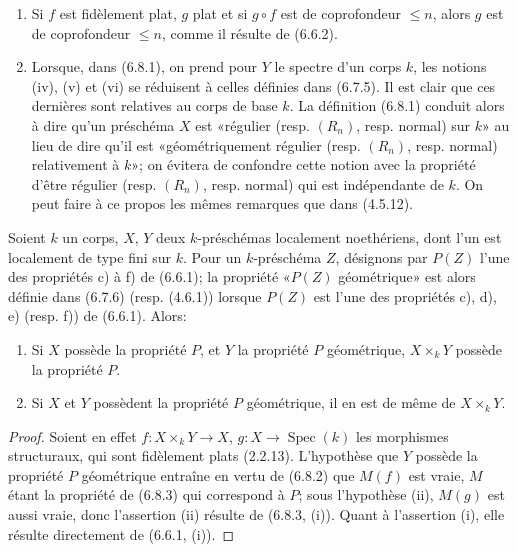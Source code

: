 \begin{remarks}[6.8.4]
\label{IV.2.s6.8.4-fr}
\begin{enumerate}
\item[(i)] Si $f$ est fidèlement plat, $g$ plat et si $g\circ f$ est de
coprofondeur $\leq n$, alors $g$ est de coprofondeur $\leq n$, comme il
résulte de (6.6.2).
\item[(ii)] Lorsque, dans (6.8.1), on prend pour $Y$ le spectre d'un corps
$k$, les notions (iv), (v) et (vi) se réduisent à celles définies dans (6.7.5).
Il est clair que ces dernières sont relatives au corps de base $k$. La
définition (6.8.1) conduit alors à dire qu'un préschéma $X$ est «régulier
(resp. $(R_n)$, resp. normal) sur $k$» au lieu de dire qu'il est
«géométriquement régulier (resp. $(R_n)$, resp. normal) relativement à $k$»;
on évitera de confondre cette notion avec la propriété d'être régulier (resp.
$(R_n)$, resp. normal) qui est indépendante de $k$. On peut faire à ce propos
les mêmes remarques que dans (4.5.12).
\end{enumerate}
\end{remarks}

\begin{proposition}[6.8.5]
\label{IV.2.s6.8.5-fr}
Soient $k$ un corps, $X$, $Y$ deux $k$-préschémas localement noethériens,
dont l'un est localement de type fini sur $k$. Pour un $k$-préschéma $Z$,
désignons par $P(Z)$ l'une des propriétés c) à f) de (6.6.1); la propriété
«$P(Z)$ géométrique» est alors définie dans (6.7.6) (resp. (4.6.1)) lorsque
$P(Z)$ est l'une des propriétés c), d), e) (resp. f)) de (6.6.1). Alors:
\begin{enumerate}
\item[(i)] Si $X$ possède la propriété $P$, et $Y$ la propriété $P$
géométrique, $X\times_kY$ possède la propriété $P$.
\item[(ii)] Si $X$ et $Y$ possèdent la propriété $P$ géométrique, il en est
de même de $X\times_kY$.
\end{enumerate}
\end{proposition}

\begin{proof}
Soient en effet $f:X\times_kY\to X$, $g:X\to\operatorname{Spec}(k)$ les
morphismes structuraux, qui sont fidèlement plats (2.2.13). L'hypothèse que
$Y$ possède la propriété $P$ géométrique entraîne en vertu de (6.8.2) que
$M(f)$ est vraie, $M$ étant la propriété de (6.8.3) qui correspond à $P$; sous
l'hypothèse (ii), $M(g)$ est aussi vraie, donc l'assertion (ii) résulte de
(6.8.3, (i)). Quant à l'assertion (i), elle résulte directement de (6.6.1, (i)).
\end{proof}

